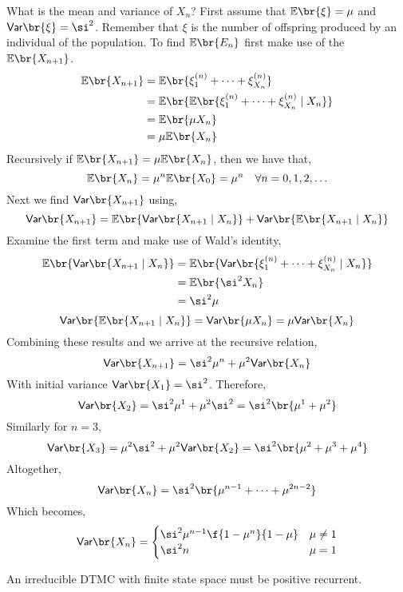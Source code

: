 \documentclass{article}
\newcommand{\Var}{\textsf{Var}}
\newcommand{\Exp}{\mathbb{E}}
\begin{document}
    What is the mean and variance of $X_n$? First assume that $\Exp\br{\xi} = \mu$ and $\Var\br{\xi} = \si^2$. Remember that $\xi$ is the number of offspring produced by an individual of the population. To find $\Exp\br{E_n}$ first make use of the $\Exp\br{X_{n+1}}$.
    \begin{align*}
    \Exp\br{X_{n+1}}
    &= \Exp\br{\xi^{(n)}_1 + \cdots + \xi^{(n)}_{X_n}}\\
    &= \Exp\br{\Exp\br{\xi^{(n)}_1 + \cdots + \xi^{(n)}_{X_n}\mid X_n}}\\
    &= \Exp\br{\mu X_n}\\
    &= \mu \Exp\br{X_n}
    \end{align*}
    Recursively if $\Exp\br{X_{n+1}} = \mu \Exp\br{X_n}$, then we have that,
    \[ \Exp\br{X_n} = \mu^n \Exp\br{X_0} = \mu^n  \quad \forall n = 0, 1, 2, \ldots \]
    Next we find $\Var\br{X_{n+1}}$ using,
    \[ \Var\br{X_{n+1}} = \Exp\br{\Var\br{X_{n+1} \mid X_n}} + \Var\br{\Exp\br{X_{n+1} \mid X_n}} \]
    Examine the first term and make use of Wald's identity,
    \begin{align*}
        \Exp\br{\Var\br{X_{n+1} \mid X_n}}
        &= \Exp\br{\Var\br{\xi^{(n)}_1 + \cdots + \xi^{(n)}_{X_n} \mid X_n}} \\
        &= \Exp\br{\si^2 X_n} \\
        &= \si^2 \mu
    \end{align*}
    \[ \Var\br{\Exp\br{X_{n+1} \mid X_n}} = \Var\br{\mu X_n} = \mu \Var\br{X_n} \]
    Combining these results and we arrive at the recursive relation,
    \[ \Var\br{X_{n+1}} = \si^2 \mu^n + \mu^2 \Var\br{X_n} \]
    With initial variance $\Var\br{X_1} = \si^2$. Therefore,
    \[ \Var\br{X_2} = \si^2 \mu^1 + \mu^2 \si^2 = \si^2 \br{\mu^1 + \mu^2} \]
    Similarly for $n = 3$,
    \[ \Var\br{X_3} = \mu^2 \si^2  + \mu^2 \Var\br{X_2} = \si^2 \br{\mu^2 + \mu^3 + \mu^4} \]
    Altogether,
    \[ \Var\br{X_n} = \si^2 \br{\mu^{n-1} + \cdots + \mu^{2n-2}} \]
    Which becomes,
    \[ \Var\br{X_n} = \begin{cases}
        \si^2 \mu^{n-1}\f{1 - \mu^n}{1 - \mu} & \mu \neq 1 \\
        \si^2n & \mu = 1 \\
    \end{cases} \]

    \begin{theorem}
        \label{thm:finite_state_space}
        An irreducible DTMC with finite state space must be positive recurrent.
    \end{theorem}
\end{document}

